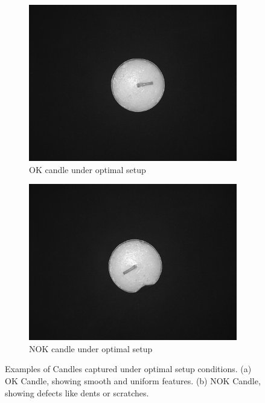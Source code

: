 \documentclass[12pt,DIV14,BCOR12mm,a4paper,footinclude=false,headinclude,parskip=half-,twoside,openright,cleardoublepage=empty,toc=index,bibliography=totoc,listof=totoc]{scrreprt}
\numberwithin{equation}{chapter}
\begin{document}
\begin{figure}
    \centering
    \begin{subfigure}[b]{0.45\textwidth}
        \centering
        \includegraphics[scale=0.15]{../media/Candles-optimal-OK.png}
        \caption{OK candle under optimal setup}
        \label{fig:candle_ok}
    \end{subfigure}
    \hfill
    \begin{subfigure}[b]{0.45\textwidth}
        \centering
        \includegraphics[scale=0.15]{../media/Candles-optimal-NOK.png}
        \caption{NOK candle under optimal setup}
        \label{fig:candle_nok}
    \end{subfigure}
    \caption{Examples of Candles captured under optimal setup conditions. (a) OK Candle, showing smooth and uniform features. (b) NOK Candle, showing defects like dents or scratches.}
    \label{fig:optimal_setup_candles}
\end{figure}
\end{document}
